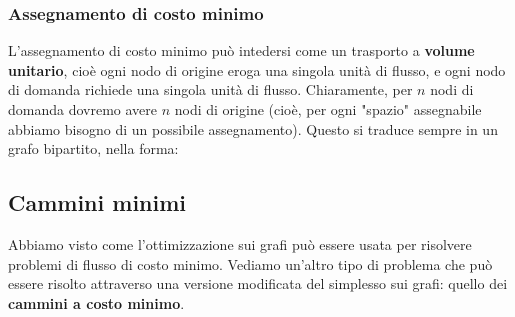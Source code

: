 \documentclass[a4paper,11pt]{article}
\begin{document}
\subsubsection{Assegnamento di costo minimo}
L'assegnamento di costo minimo può intedersi come un trasporto a \textbf{volume unitario}, cioè ogni nodo di origine eroga una singola unità di flusso, e ogni nodo di domanda richiede una singola unità di flusso.
Chiaramente, per $n$ nodi di domanda dovremo avere $n$ nodi di origine (cioè, per ogni "spazio" assegnabile abbiamo bisogno di un possibile assegnamento).
Questo si traduce sempre in un grafo bipartito, nella forma:
\begin{center}
\end{center}

\subsection{Cammini minimi}
Abbiamo visto come l'ottimizzazione sui grafi può essere usata per risolvere problemi di flusso di costo minimo.
Vediamo un'altro tipo di problema che può essere risolto attraverso una versione modificata del simplesso sui grafi: quello dei \textbf{cammini a costo minimo}.
\end{document}
